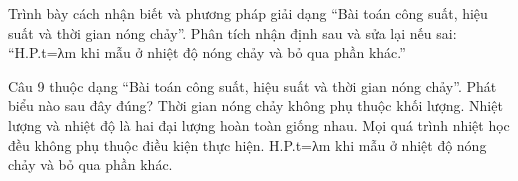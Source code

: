 \begin{bt}
Trình bày cách nhận biết và phương pháp giải dạng “Bài toán công suất, hiệu suất và thời gian nóng chảy”. Phân tích nhận định sau và sửa lại nếu sai: “H.P.t=λm khi mẫu ở nhiệt độ nóng chảy và bỏ qua phần khác.”
\end{bt}

\begin{ex}
Câu 9 thuộc dạng “Bài toán công suất, hiệu suất và thời gian nóng chảy”. Phát biểu nào sau đây đúng?
\choice
{Thời gian nóng chảy không phụ thuộc khối lượng.}
{Nhiệt lượng và nhiệt độ là hai đại lượng hoàn toàn giống nhau.}
{Mọi quá trình nhiệt học đều không phụ thuộc điều kiện thực hiện.}
{\True H.P.t=λm khi mẫu ở nhiệt độ nóng chảy và bỏ qua phần khác.}
\end{ex}


